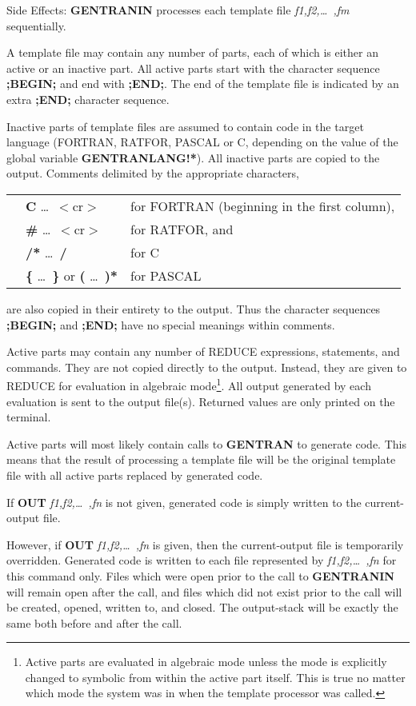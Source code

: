 \begin{describe}{Side Effects:}
{\bf GENTRANIN} processes each template file {\it f1,f2,\dots\ ,fm}
sequentially.

A template file may contain any number of parts, each of which
is either an active or an inactive part.  All active parts start with
the character sequence {\bf ;BEGIN;} and end with {\bf ;END;}.  The end
of the template file is indicated by an extra {\bf ;END;} character
sequence.

Inactive parts of template files are assumed to contain code in the
target language (FORTRAN, RATFOR, PASCAL or C, depending on the value
of the global variable {\bf GENTRANLANG!*}).  All inactive parts are
copied to the output.  Comments delimited by the appropriate characters,
\begin{center}
\begin{tabular}{lll}
&{\bf C} \dots\  $<$cr$>$ & for FORTRAN (beginning in the first column),\\
&{\bf \#} \dots\  $<$cr$>$ & for RATFOR, and\\
&{\bf /*} \dots\  {\bf */} & for C\\
&{\bf \{} \dots\ {\bf \}} or {\bf *(} \dots\  {\bf )*} & for PASCAL\\
\end{tabular}
\end{center}
are also copied in their entirety to the output.  Thus the character
sequences {\bf ;BEGIN;} and {\bf ;END;} have no special meanings
within comments.

Active parts may contain any number of REDUCE expressions,
statements, and commands.  They are not copied directly to the
output.  Instead, they are given to REDUCE for
evaluation in algebraic mode\footnote{
Active parts are evaluated in algebraic mode unless the mode is
explicitly changed to symbolic from within the active part itself.  This
is true no matter which mode the system was in when the template
processor was called.}.
All output generated by each evaluation is sent to the
output file(s).  Returned values are only printed on the terminal.

Active parts will most likely contain calls to {\bf GENTRAN} to
generate code.  This means that the result of processing a
template file will be the original template file with all active
parts replaced by generated code.

If {\bf OUT} {\it f1,f2,\dots\ ,fn} is not given, generated code is simply
written to the current-output file.

However, if {\bf OUT} {\it  f1,f2,\dots\ ,fn}
is given, then the current-output file
is temporarily overridden.  Generated code is written to each file represented
by {\it f1,f2,\dots\ ,fn} for this command only.  Files which were
open prior to the call to {\bf GENTRANIN} will remain open after the
call, and files which did not exist prior to the call will be
created, opened, written to, and closed.  The output-stack will be
exactly the same both before and after the call.
\end{describe}
